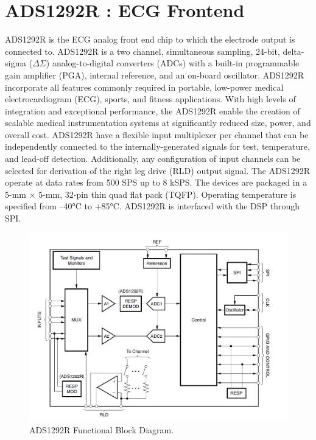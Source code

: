 \section{ADS1292R : ECG Frontend}
ADS1292R is the ECG analog front end chip to which the electrode output is connected to. ADS1292R is a two channel, simultaneous sampling, 24-bit, delta-sigma ($\Delta$$\Sigma$) analog-to-digital converters (ADCs) with a built-in programmable gain amplifier (PGA), internal reference, and an on-board oscillator. ADS1292R incorporate all features commonly required in portable, low-power medical electrocardiogram (ECG), sports, and fitness applications. With high levels of integration and exceptional performance, the ADS1292R enable the creation of scalable medical instrumentation systems at significantly reduced size, power, and overall cost. ADS1292R have a flexible input multiplexer per channel that can be independently connected to the internally-generated signals for test, temperature, and lead-off detection. Additionally, any configuration of input channels can be selected for derivation of the right leg drive (RLD) output signal. The ADS1292R operate at data rates from 500 SPS up to 8 kSPS. The devices are packaged in a 5-mm × 5-mm, 32-pin thin quad flat pack (TQFP). Operating temperature is specified from –40°C to +85°C. ADS1292R is interfaced with the DSP through SPI.
 \begin{figure}[h]
 	\centering
 	\includegraphics[scale = 0.7 ]{ADS1292R.JPG}
 	\caption{ADS1292R Functional Block Diagram. \cite{ads}\label{ADS1292R}}
 \end{figure}
 
